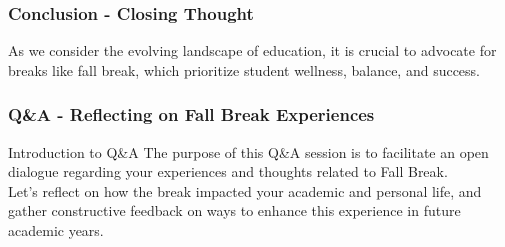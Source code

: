 \documentclass[aspectratio=169]{beamer}
\begin{document}
\begin{frame}[fragile]
    \frametitle{Conclusion - Closing Thought}
    As we consider the evolving landscape of education, it is crucial to advocate for breaks like fall break, which prioritize student wellness, balance, and success.
\end{frame}

\begin{frame}[fragile]
    \frametitle{Q\&A - Reflecting on Fall Break Experiences}
    
    \begin{block}{Introduction to Q\&A}
        The purpose of this Q\&A session is to facilitate an open dialogue regarding your experiences and thoughts related to Fall Break. \\
        Let's reflect on how the break impacted your academic and personal life, and gather constructive feedback on ways to enhance this experience in future academic years.
    \end{block}
\end{frame}
\end{document}
